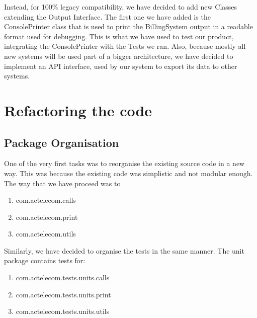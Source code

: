 \documentclass[11pt,twocolumn]{article} %
\begin{document}
Instead, for 100\% legacy compatibility, we have decided to add new Classes extending the Output Interface. 
The first one we have added is the ConsolePrinter class that is used to print the BillingSystem output in a readable format used for debugging.
This is what we have used to test our product, integrating the ConsolePrinter with the Tests we ran. Also, because mostly all new systems will be used 
part of a bigger architecture, we have decided to implement an API interface, used by our system to export its data to other systems. 




\section{Refactoring the code}

\subsection{Package Organisation}
One of the very first tasks was to reorganise the existing source code in a new way.
This was because the existing code was simplistic and not modular enough. The way that
we have proceed was to 

\begin{enumerate}
 \item{com.actelecom.calls}
 \item{com.actelecom.print}
 \item{com.actelecom.utils}
\end{enumerate}

Similarly, we have decided to organise the tests in the same manner. The unit package contains tests for:
\begin{enumerate}
 \item{com.actelecom.tests.units.calls}
 \item{com.actelecom.tests.units.print}
 \item{com.actelecom.tests.units.utils}
\end{enumerate}

\end{document}
